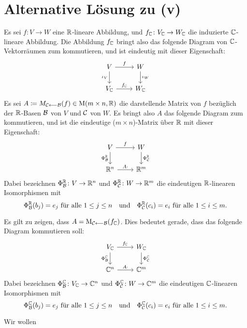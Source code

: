\documentclass[a4paper,10pt]{article}
\begin{document}
\section{Alternative Lösung zu (v)}

Es sei $f \colon V \to W$ eine $\mathbb{R}$-lineare Abbildung, und $f_{\mathbb{C}} \colon V_{\mathbb{C}} \to W_{\mathbb{C}}$ die induzierte $\mathbb{C}$-lineare Abbildung.
Die Abbildung $f_{\mathbb{C}}$ bringt also das folgende Diagram von $\mathbb{C}$-Vektorräumen zum kommutieren, und ist eindeutig mit dieser Eigenschaft:
\[
  \begin{tikzcd}
      V       \arrow[r, "f"]      \arrow[d, "\iota_V"']
    & W                           \arrow[d, "\iota_W"]
    \\
      V_\Cbb  \arrow[r, "f_\Cbb"]
    & W_\Cbb
  \end{tikzcd}
\]
Es sei $A \coloneqq M_{\mathcal{C} \longleftarrow \mathcal{B}}(f) \in \operatorname{M}(m \times n, \mathbb{R})$ die darstellende Matrix von $f$ bezüglich der $\mathbb{R}$-Basen $\mathcal{B}$ von $V$ und $\mathcal{C}$ von $W$.
Es bringt also $A$ das folgende Diagram zum kommutieren, und ist die eindeutige ($m \times n$)-Matrix über $\mathbb{R}$ mit dieser Eigenschaft:
\[
  \begin{tikzcd}
      V      \arrow[r, "f"]       \arrow[d, "\Phi^\Rbb_\mc{B}"']
    & W                           \arrow[d, "\Phi^\Rbb_\mc{C}"]
    \\
      \Rbb^n \arrow[r, "A \cdot"]
    & \Rbb^m
  \end{tikzcd}
\]
Dabei bezeichnen $\Phi^{\mathbb{R}}_{\mathcal{B}} \colon V \to \mathbb{R}^n$ und $\Phi^{\mathbb{R}}_{\mathcal{C}} \colon W \to \mathbb{R}^m$ die eindeutigen $\mathbb{R}$-linearen Isomorphismen mit
\[
  \text{$\Phi^{\mathbb{R}}_{\mathcal{B}}(b_j) = e_j$ für alle $1 \leq j \leq n$}
  \quad\text{und}\quad
  \text{$\Phi^{\mathbb{R}}_{\mathcal{C}}(c_i) = e_i$ für alle $1 \leq i \leq m$}.
\]

Es gilt zu zeigen, dass $A = \operatorname{M}_{\mathcal{C} \longleftarrow \mathcal{B}}(f_{\mathbb{C}})$.
Dies bedeutet gerade, dass das folgende Diagram kommutieren soll:
\[
  \begin{tikzcd}
      V_\Cbb  \arrow[r, "f_\Cbb"]   \arrow[d, "\Phi^\Cbb_\mc{B}"']
    & W_\Cbb                        \arrow[d, "\Phi^\Cbb_\mc{C}"]
    \\
      \Cbb^n  \arrow[r, "A \cdot"]
    & \Cbb^m
  \end{tikzcd}
\]
Dabei bezeichnen $\Phi^{\mathbb{C}}_{\mathcal{B}} \colon V_{\mathbb{C}} \to \mathbb{C}^n$ und $\Phi^{\mathbb{C}}_{\mathcal{C}} \colon W \to \mathbb{C}^m$ die eindeutigen $\mathbb{C}$-linearen Isomorphismen mit
\[
  \text{$\Phi^{\mathbb{C}}_{\mathcal{B}}(b_j) = e_j$ für alle $1 \leq j \leq n$}
  \quad\text{und}\quad
  \text{$\Phi^{\mathbb{C}}_{\mathcal{C}}(c_i) = e_i$ für alle $1 \leq i \leq m$}.
\]

Wir wollen 
\end{document}
